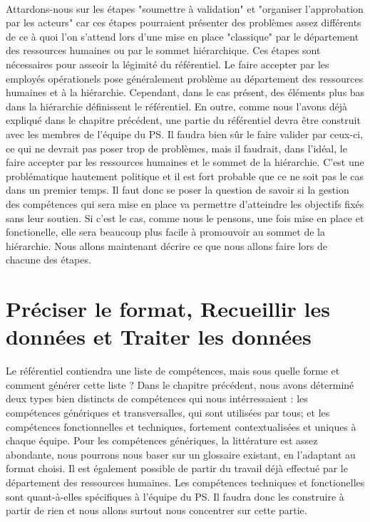 \paragraph{} Attardons-nous sur les étapes "soumettre à validation" et "organiser l'approbation par les acteurs" car ces étapes pourraient présenter des problèmes assez différents de ce à quoi l'on s'attend lors d'une mise en place "classique" par le département des ressources humaines ou par le sommet hiérarchique. 
Ces étapes sont nécessaires pour asseoir la légimité du référentiel. Le faire accepter par les employés opérationels pose généralement problème au département des ressources humaines et à la hiérarchie. Cependant, dans le cas présent, des éléments plus bas dans la hiérarchie définissent le référentiel. En outre, comme nous l'avons déjà expliqué dans le chapitre précédent, une partie du référentiel devra être construit avec les membres de l'équipe du PS. Il faudra bien sûr le faire valider par ceux-ci, ce qui ne devrait pas poser trop de problèmes, mais il faudrait, dans l'idéal, le faire accepter par les ressources humaines et le sommet de la hiérarchie. C'est une problématique hautement politique et il est fort probable que ce ne soit pas le cas dans un premier temps. Il faut donc se poser la question de savoir si la gestion des compétences qui sera mise en place va permettre d'atteindre les objectifs fixés sans leur soutien. Si c'est le cas, comme nous le pensons, une fois mise en place et fonctionelle, elle sera beaucoup plus facile à promouvoir au sommet de la hiérarchie. Nous allons maintenant décrire ce que nous allons faire lors de chacune des étapes. 

\section{Préciser le format, Recueillir les données et Traiter les données}
Le référentiel contiendra une liste de compétences, mais sous quelle forme et comment générer cette liste ? Dans le chapitre précédent, nous avons déterminé deux types bien distincts de compétences qui nous intérressaient : les compétences génériques et transversalles, qui sont utilisées par tous; et les compétences fonctionnelles et techniques, fortement contextualisées et uniques à chaque équipe. Pour les compétences génériques, la littérature est assez abondante, nous pourrons nous baser sur un glossaire existant\citep{exemple_ref}, en l'adaptant au format choisi. Il est également possible de partir du travail déjà effectué par le département des ressources humaines. Les compétences techniques et fonctionelles sont quant-à-elles spécifiques à l'équipe du PS. Il faudra donc les construire à partir de rien et nous allons surtout nous concentrer sur cette partie. 

